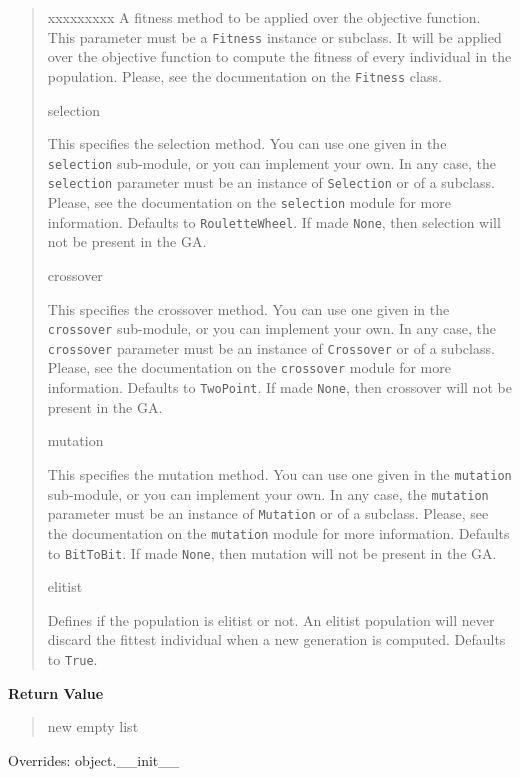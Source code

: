 \begin{boxedminipage}{\funcwidth}
\begin{quote}
\begin{Ventry}{xxxxxxxxx}
A fitness method to be applied over the objective function. This
parameter must be a \texttt{Fitness} instance or subclass. It will be
applied over the objective function to compute the fitness of every
individual in the population. Please, see the documentation on the
\texttt{Fitness} class.
          \item[selection]


This specifies the selection method. You can use one given in the
\texttt{selection} sub-module, or you can implement your own. In any
case, the \texttt{selection} parameter must be an instance of
\texttt{Selection} or of a subclass. Please, see the documentation on the
\texttt{selection} module for more information. Defaults to
\texttt{RouletteWheel}. If made \texttt{None}, then selection will not be
present in the GA.
          \item[crossover]


This specifies the crossover method. You can use one given in the
\texttt{crossover} sub-module, or you can implement your own. In any
case, the \texttt{crossover} parameter must be an instance of
\texttt{Crossover} or of a subclass. Please, see the documentation on the
\texttt{crossover} module for more information. Defaults to
\texttt{TwoPoint}. If made \texttt{None}, then crossover will not be
present in the GA.
          \item[mutation]


This specifies the mutation method. You can use one given in the
\texttt{mutation} sub-module, or you can implement your own. In any
case, the \texttt{mutation} parameter must be an instance of \texttt{Mutation}
or of a subclass. Please, see the documentation on the \texttt{mutation}
module for more information. Defaults to \texttt{BitToBit}.  If made
\texttt{None}, then mutation will not be present in the GA.
          \item[elitist]


Defines if the population is elitist or not. An elitist population
will never discard the fittest individual when a new generation is
computed. Defaults to \texttt{True}.
        \end{Ventry}

      \end{quote}

      \textbf{Return Value}
    \vspace{-1ex}

      \begin{quote}

new empty list
      \end{quote}

      Overrides: object.\_\_init\_\_

    \end{boxedminipage}

